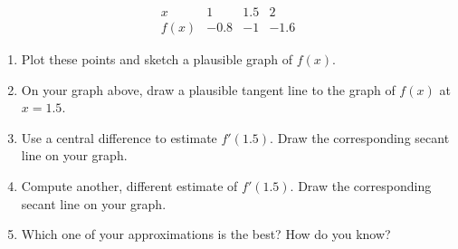 \[
\begin{array}{c||r|r|r}
      x  &  1 &  1.5   &  2 \\\hline
    f(x) & -0.8 & -1   & -1.6
\end{array}
\]
\begin{enumerate}[leftmargin=0pt]

\item Plot these points and sketch a plausible graph of $f(x)$.


\item On your graph above, draw a plausible tangent line to the graph of $f(x)$ at $x=1.5$.

\item Use a central difference to estimate $f'(1.5)$. Draw the corresponding secant line on your graph.
\vfill

\item Compute another, different estimate of $f'(1.5)$. Draw the corresponding secant line on your graph.

\vfill

\item Which one of your approximations is the best? How do you know?

\vspace{1cm}

\end{enumerate}

